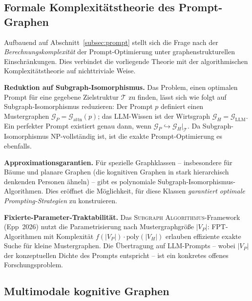 ﻿\documentclass[12pt,a4paper]{article}
\theoremstyle{plain}
\theoremstyle{definition}
\theoremstyle{remark}
\newcommand{\GG}{\mathcal{G}}
\newcommand{\SA}{\textnormal{\textsc{Subgraph Algorithmus}}}
\begin{document}
\subsection{Formale Komplexitätstheorie des Prompt-Graphen}
\label{subsec:komplexitaet_prompt}

Aufbauend auf Abschnitt~\ref{subsec:prompt} stellt sich die Frage nach der \emph{Berechnungskomplexität} der Prompt-Optimierung unter graphenstrukturellen Einschränkungen. Dies verbindet die vorliegende Theorie mit der algorithmischen Komplexitätstheorie auf nichttriviale Weise.

\textbf{Reduktion auf Subgraph-Isomorphismus.} Das Problem, einen optimalen Prompt für eine gegebene Zielstruktur $\mathcal{T}$ zu finden, lässt sich wie folgt auf Subgraph-Isomorphismus reduzieren: Der Prompt $p$ definiert einen Mustergraphen $\GG_P = \GG_{\text{attn}}(p)$; das LLM-Wissen ist der Wirtsgraph $\GG_H = \GG_{\text{LLM}}$. Ein perfekter Prompt existiert genau dann, wenn $\GG_P \hookrightarrow \GG_H|_\mathcal{T}$. Da Subgraph-Isomorphismus NP-vollständig ist, ist die exakte Prompt-Optimierung es ebenfalls.

\textbf{Approximationsgarantien.} Für spezielle Graphklassen -- insbesondere für Bäume und planare Graphen (die kognitiven Graphen in stark hierarchisch denkenden Personen ähneln) -- gibt es polynomiale Subgraph-Isomorphismus-Algorithmen. Dies eröffnet die Möglichkeit, für diese Klassen \emph{garantiert optimale Prompting-Strategien} zu konstruieren.

\textbf{Fixierte-Parameter-Traktabilität.} Das \SA{}-Frame\-work (Epp~2026) nutzt die Parametrisierung nach Mustergraphgröße $|V_P|$: FPT-Algorithmen mit Komplexität $f(|V_P|) \cdot \text{poly}(|V_H|)$ erlauben effiziente exakte Suche für kleine Mustergraphen. Die Übertragung auf LLM-Prompts -- wobei $|V_P|$ der konzeptuellen Dichte des Prompts entspricht -- ist ein konkretes offenes Forschungsproblem.

\subsection{Multimodale kognitive Graphen}
\label{subsec:multimodal}
\end{document}
